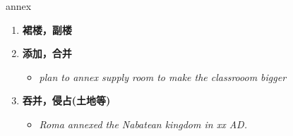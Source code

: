 
\begin{frame}
{\huge annex}
\begin{center}
\begin{enumerate}\Large
  \item \textbf{裙楼，副楼}
  \item \textbf{添加，合并}
  \begin{itemize}
    \item \em{\Large{plan to annex supply room to make the classrooom bigger}}
  \end{itemize}
  \item \textbf{吞并，侵占(土地等)}
  \begin{itemize}
    \item \em{\Large{Roma annexed the Nabatean kingdom in xx AD.}}
  \end{itemize}
\end{enumerate}
\end{center}
\end{frame}

